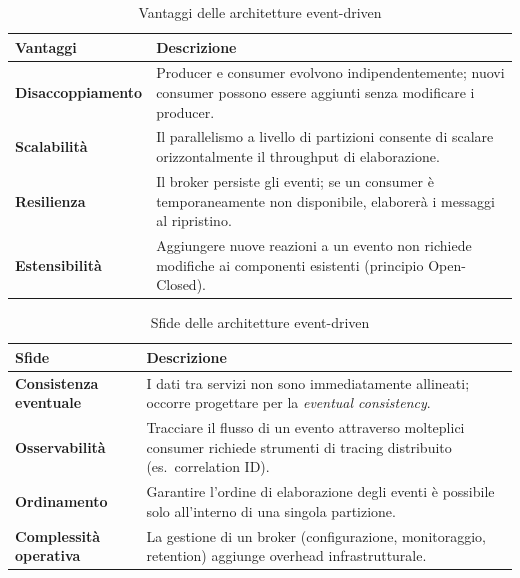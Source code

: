 \documentclass[12pt,a4paper]{report}
\begin{document}
\begin{table}[H]
\centering
\renewcommand{\arraystretch}{1.3}
\begin{tabularx}{\textwidth}{>{\bfseries}l X}
\toprule
\textbf{Vantaggi} & \textbf{Descrizione} \\
\midrule
Disaccoppiamento   & Producer e consumer evolvono indipendentemente; nuovi
                     consumer possono essere aggiunti senza modificare i producer. \\
Scalabilità        & Il parallelismo a livello di partizioni consente di scalare
                     orizzontalmente il throughput di elaborazione. \\
Resilienza         & Il broker persiste gli eventi; se un consumer è
                     temporaneamente non disponibile, elaborerà i messaggi al
                     ripristino. \\
Estensibilità      & Aggiungere nuove reazioni a un evento non richiede
                     modifiche ai componenti esistenti (principio Open-Closed). \\
\bottomrule
\end{tabularx}
\caption{Vantaggi delle architetture event-driven}
\label{tab:eda-vantaggi}
\end{table}

\begin{table}[H]
\centering
\renewcommand{\arraystretch}{1.3}
\begin{tabularx}{\textwidth}{>{\bfseries}l X}
\toprule
\textbf{Sfide} & \textbf{Descrizione} \\
\midrule
Consistenza eventuale & I dati tra servizi non sono immediatamente allineati;
                        occorre progettare per la \textit{eventual consistency}. \\
Osservabilità         & Tracciare il flusso di un evento attraverso molteplici
                        consumer richiede strumenti di tracing distribuito
                        (es.\ correlation ID). \\
Ordinamento           & Garantire l'ordine di elaborazione degli eventi è
                        possibile solo all'interno di una singola partizione. \\
Complessità operativa & La gestione di un broker (configurazione, monitoraggio,
                        retention) aggiunge overhead infrastrutturale. \\
\bottomrule
\end{tabularx}
\caption{Sfide delle architetture event-driven}
\label{tab:eda-sfide}
\end{table}
\end{document}
